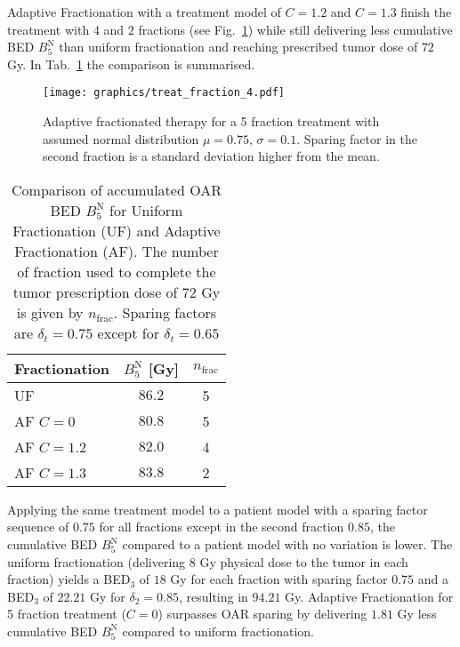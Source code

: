 \documentclass[\relativeRoot/ada.tex]{subfiles}
\begin{document}
Adaptive Fractionation with a treatment model of $C=1.2$ and $C=1.3$ finish the treatment with $4$ and $2$ fractions (see Fig.~\ref{fig:treat_fraction_4}) while still delivering less cumulative BED $B_5^{\text{N}}$ than uniform fractionation and reaching prescribed tumor dose of $72$ Gy. In Tab.~\ref{tab:result_treat_fraction_4} the comparison is summarised.

\begin{figure}[!htb]
    \centering
    \texttt{[image: graphics/treat\_fraction\_4.pdf]}
    \caption{Adaptive fractionated therapy for a 5 fraction treatment with assumed normal distribution $\mu=0.75$, $\sigma=0.1$. Sparing factor in the second fraction is a standard deviation higher from the mean.}
    \label{fig:treat_fraction_4}
\end{figure}

\begin{table}[!htb]
    \centering
    \caption{Comparison of accumulated OAR BED $B_5^{\text{N}}$ for Uniform Fractionation (UF) and Adaptive Fractionation (AF). The number of fraction used to complete the tumor prescription dose of $72$ Gy is given by $n_{\text{frac}}$. Sparing factors are $\delta_t=0.75$ except for $\delta_t=0.65$}
    \begin{tabular}{l|cc}
    \toprule
        Fractionation & $B_5^{\text{N}}$ [Gy] & $n_{\text{frac}}$ \\
    \midrule
       UF &  $86.2$ & 5 \\
       AF $C=0$ & $80.8$ & 5 \\
       AF $C=1.2$ & $82.0$ & 4 \\
       AF $C=1.3$ & $83.8$ & 2 \\
     
    \bottomrule
    \end{tabular}
    \label{tab:result_treat_fraction_4}
\end{table}

Applying the same treatment model to a patient model with a sparing factor sequence of $0.75$ for all fractions except in the second fraction $0.85$, the cumulative BED $B_5^{\text{N}}$ compared to a patient model with no variation is lower. The uniform fractionation (delivering $8$ Gy physical dose to the tumor in each fraction) yields a BED$_3$ of $18$ Gy for each fraction with sparing factor $0.75$ and a BED$_3$ of $22.21$ Gy for $\delta_2=0.85$, resulting in $94.21$ Gy. Adaptive Fractionation for 5 fraction treatment ($C=0$) surpasses OAR sparing by delivering $1.81$ Gy less cumulative BED $B_5^{\text{N}}$ compared to uniform fractionation.
\end{document}
